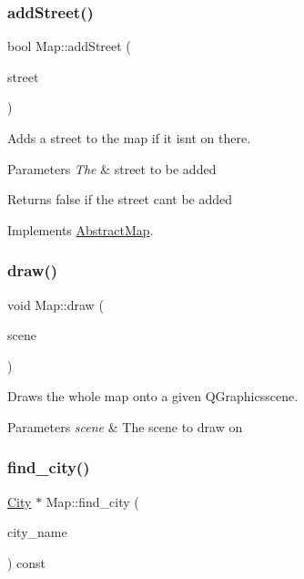 \subsubsection{\texorpdfstring{add\+Street()}{addStreet()}}
{\footnotesize\ttfamily bool Map\+::add\+Street (\begin{DoxyParamCaption}\item[{\hyperlink{class_street}{Street} $\ast$}]{street }\end{DoxyParamCaption})\hspace{0.3cm}{\ttfamily [virtual]}}



Adds a street to the map if it isn\textquotesingle{}t on there. 


\begin{DoxyParams}{Parameters}
{\em The} & street to be added \\
\hline
\end{DoxyParams}
\begin{DoxyReturn}{Returns}
false if the street cant be added 
\end{DoxyReturn}


Implements \hyperlink{class_abstract_map_a179d25c28087d9090314caff024b1f46}{Abstract\+Map}.

\mbox{\label{class_map_af7386ac56bf2ff2d5598ae6e08dc8193}} 
\subsubsection{\texorpdfstring{draw()}{draw()}}
{\footnotesize\ttfamily void Map\+::draw (\begin{DoxyParamCaption}\item[{Q\+Graphics\+Scene \&}]{scene }\end{DoxyParamCaption})}



Draws the whole map onto a given Q\+Graphicsscene. 


\begin{DoxyParams}{Parameters}
{\em scene} & The scene to draw on \\
\hline
\end{DoxyParams}
\mbox{\label{class_map_acb7d6869cfe4e6e91d3a1c5155ad89b2}} 
\subsubsection{\texorpdfstring{find\+\_\+city()}{find\_city()}}
{\footnotesize\ttfamily \hyperlink{class_city}{City} $\ast$ Map\+::find\+\_\+city (\begin{DoxyParamCaption}\item[{const Q\+String}]{city\+\_\+name }\end{DoxyParamCaption}) const\hspace{0.3cm}{\ttfamily [virtual]}}



